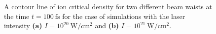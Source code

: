 \begin{figure}[h!]
	\centering
	\hspace{1mm}
	\caption{A contour line of ion critical density for two different beam waists at the time $ t = 100 \ \mathrm{fs} $ for the case of simulations with the laser intensity \textbf{(a)} $ I = 10^{20} \ \mathrm{W/cm^2} $ and \textbf{(b)} $ I = 10^{21} \ \mathrm{W/cm^2} $.}
	\label{fig:15}
\end{figure}

